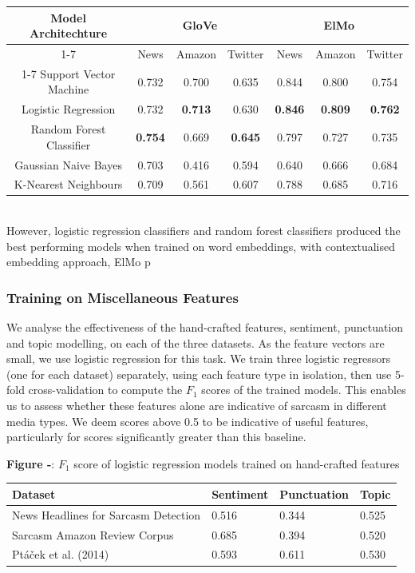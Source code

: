 \documentclass[12pt,a4paper]{article}
\begin{document}
\begin{tabular}{|c||c|c|c||c|c|c|}
	\hline
	\multirow{3}{*}{\textbf{Model Architechture}} & \multicolumn{3}{|c||}{\textbf{GloVe}} & \multicolumn{3}{c|}{\textbf{ElMo}}\\
	\cline{1-7}
	& News & Amazon & Twitter & News & Amazon & Twitter\\
	\cline{1-7}
	Support Vector Machine & 0.732 &0.700 & 0.635 & 0.844 & 0.800& 0.754\\
	Logistic Regression & 0.732 &\textbf{0.713} & 0.630 &\textbf{0.846} & \textbf{0.809} & \textbf{0.762}\\
	Random Forest Classifier & \textbf{0.754}&0.669 &\textbf{0.645} &0.797 &0.727 & 0.735\\
	Gaussian Naive Bayes &0.703 & 0.416& 0.594 &0.640 &0.666 & 0.684\\
	K-Nearest Neighbours & 0.709& 0.561 & 0.607& 0.788& 0.685 & 0.716\\
	\hline
\end{tabular}\vspace{10pt}\\


However, logistic regression classifiers and random forest classifiers produced the best performing models when trained on word embeddings, with contextualised embedding approach, ElMo p


\vspace{10pt}
\subsubsection{Training on Miscellaneous Features}
\noindent We analyse the effectiveness of the hand-crafted features, sentiment, punctuation and topic modelling, on each of the three datasets. As the feature vectors are small, we use logistic regression for this task. We train three logistic regressors (one for each dataset) separately, using each feature type in isolation, then use 5-fold cross-validation to compute the $F_1$ scores of the trained models. This enables us to assess whether these features alone are indicative of sarcasm in different media types. We deem scores above 0.5 to be indicative of useful features, particularly for scores significantly greater than this baseline.

\begin{center}
	\textbf{Figure -}: $F_1$ score of logistic regression models trained on hand-crafted features
\end{center}

\begin{center}
	\begin{tabular}{|p{7cm}|p{1.8cm}|p{2.6cm}|p{1.6cm}|} 
		\hline
		\textbf{Dataset} & \textbf{Sentiment} & \textbf{Punctuation} & \textbf{Topic} \\ [0.4ex] 
		\hline\hline
		News Headlines for Sarcasm Detection & 0.516 & 0.344 & 0.525\\ 
		\hline
		Sarcasm Amazon Review Corpus & 0.685 & 0.394 & 0.520\\ 
		\hline
		Pt\'a\v{c}ek et al. (2014) & 0.593 & 0.611 & 0.530\\
		\hline
	\end{tabular}
\end{center}
\end{document}
